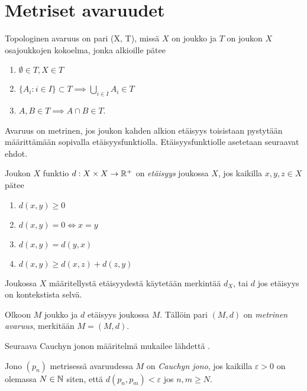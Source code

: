 \documentclass[12pt,oneside,a4paper]{amsbook} %
\begin{document}
\section{Metriset avaruudet}

\begin{definition}
    Topologinen avaruus on pari (X, T), missä $X$ on joukko ja $T$ on joukon $X$ osajoukkojen kokoelma, jonka alkioille pätee
    \begin{enumerate}
        \item $\displaystyle \emptyset \in T, X \in T$
        \item $\displaystyle \{A_i : i\in I\} \subset T \implies \bigcup_{i \in I} A_i \in T$
        \item $\displaystyle A, B \in T \implies A\cap B \in T$.
    \end{enumerate}
\end{definition}

Avaruus on metrinen, jos joukon kahden alkion etäisyys toisistaan pystytään määrittämään sopivalla etäisyysfunktiolla. Etäisyysfunktiolle asetetaan seuraavat ehdot.

\begin{definition}
    Joukon $X$ funktio $d: X\times X \to \mathbb{R}^+$ on \textit{etäisyys} joukossa $X$, jos kaikilla $x, y, z \in X$ pätee
    \begin{enumerate}
        \item $d(x,y) \ge 0$
        \item $d(x,y) = 0 \iff x = y$
        \item $d(x,y) = d(y,x)$
        \item $d(x,y) \ge d(x,z) + d(z,y)$
    \end{enumerate}
    Joukossa $X$ määritellystä etäisyydestä käytetään merkintää $d_X$, tai $d$ jos etäisyys on kontekstista selvä. 
\end{definition}

\begin{definition}
    Olkoon $M$ joukko ja $d$ etäisyys joukossa $M$. Tällöin pari $(M, d)$ on \textit{metrinen avaruus}, merkitään $M = (M, d)$.
\end{definition}

Seuraava Cauchyn jonon määritelmä mukailee lähdettä  \cite[s.52]{rudin}.

\begin{definition}
    Jono $(p_n)$ metrisessä avaruudessa $M$ on \textit{Cauchyn jono}, jos kaikilla $\varepsilon > 0$ on olemassa $N\in \mathbf{\mathbb{N}}$ siten, että $d(p_n, p_m) < \varepsilon$ jos $n, m\ge N$.
\end{definition}
\end{document}
